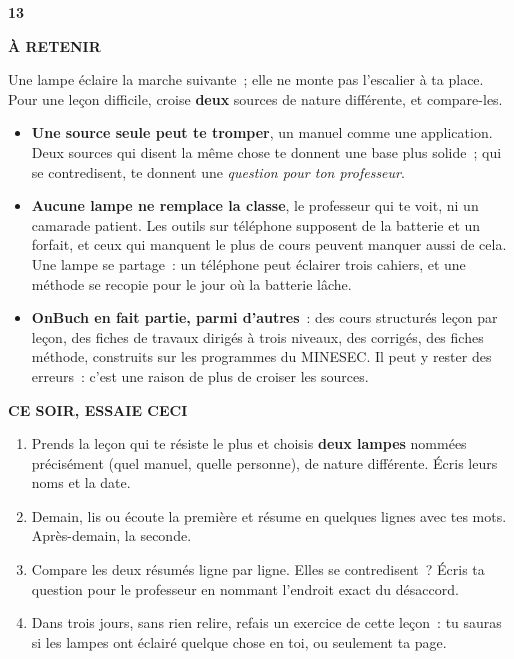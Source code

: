 \documentclass[10pt,twoside,openany]{book}
\newenvironment{aretenir}[1][À retenir]{\par\begin{tcolorbox}[enhanced,colback=creme,colframe=accent,boxrule=0pt,leftrule=3pt,arc=0pt,left=8pt,right=8pt,top=5pt,bottom=5pt,breakable]{\small\bfseries\color{accent}\MakeUppercase{#1}}\par\smallskip}{\end{tcolorbox}\par}
\newenvironment{cesoir}[1][Ce soir, essaie ceci]{\par\begin{tcolorbox}[enhanced,colback=white,colframe=vert,boxrule=0.6pt,arc=2pt,left=8pt,right=8pt,top=5pt,bottom=5pt,breakable]{\small\bfseries\color{vert}\MakeUppercase{#1}}\par\smallskip\small}{\end{tcolorbox}\par}
\newcommand{\fiche}[3]{\clearpage\markright{#2}\thispagestyle{plain}%
 {\noindent\color{accent}\fontsize{40}{40}\selectfont\bfseries #1}\hspace{0.6em}{\Large\bfseries #2\par}\vspace{0.1em}{\small\color{gris}\itshape #3\par}\vspace{0.5em}}
\begin{document}
\fiche{13}{La lampe}{Chapitre 13 du livre}
\begin{aretenir}
Une lampe éclaire la marche suivante ; elle ne monte pas l’escalier à ta place. Pour une leçon difficile, croise \textbf{deux} sources de nature différente, et compare-les.
\end{aretenir}
\begin{itemize}
\item \textbf{Une source seule peut te tromper}, un manuel comme une application. Deux sources qui disent la même chose te donnent une base plus solide ; qui se contredisent, te donnent une \emph{question pour ton professeur}.
\item \textbf{Aucune lampe ne remplace la classe}, le professeur qui te voit, ni un camarade patient. Les outils sur téléphone supposent de la batterie et un forfait, et ceux qui manquent le plus de cours peuvent manquer aussi de cela. Une lampe se partage : un téléphone peut éclairer trois cahiers, et une méthode se recopie pour le jour où la batterie lâche.
\item \textbf{OnBuch en fait partie, parmi d’autres} : des cours structurés leçon par leçon, des fiches de travaux dirigés à trois niveaux, des corrigés, des fiches méthode, construits sur les programmes du MINESEC. Il peut y rester des erreurs : c’est une raison de plus de croiser les sources.
\end{itemize}
\begin{cesoir}
\begin{enumerate}
\item Prends la leçon qui te résiste le plus et choisis \textbf{deux lampes} nommées précisément (quel manuel, quelle personne), de nature différente. Écris leurs noms et la date.
\item Demain, lis ou écoute la première et résume en quelques lignes avec tes mots. Après-demain, la seconde.
\item Compare les deux résumés ligne par ligne. Elles se contredisent ? Écris ta question pour le professeur en nommant l’endroit exact du désaccord.
\item Dans trois jours, sans rien relire, refais un exercice de cette leçon : tu sauras si les lampes ont éclairé quelque chose en toi, ou seulement ta page.
\end{enumerate}
\end{cesoir}
\end{document}
